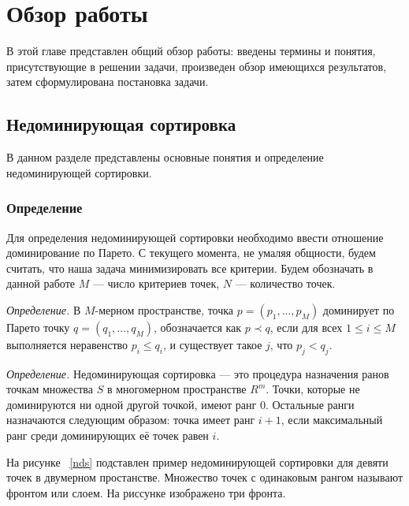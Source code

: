 
\chapter{Обзор работы}
\label{chapter1}

В этой главе представлен общий обзор работы: введены термины и понятия, присутствующие в решении задачи, произведен обзор имеющихся результатов, затем сформулирована постановка задачи.

\section{Недоминирующая сортировка}

В данном разделе представлены основные понятия и определение недоминирующей сортировки. 

\subsection{Определение}

Для определения недоминирующей сортировки необходимо ввести отношение доминирование по Парето. С текущего момента, не умаляя общности, будем считать, что наша задача минимизировать все критерии. Будем обозначать в данной работе $M$ {---} число критериев точек, $N$ {---} количество точек.

\textit{Определение.} В $M$-мерном пространстве, точка $p = (p_1,...,p_M)$ доминирует по Парето точку $q = (q_1,...,q_M)$, обозначается как $p \prec q$, если для всех $1 \leq i \leq M$ выполняется неравенство $p_i\leq q_i$, и существует такое $j$, что $p_j < q_j$.

\textit{Определение.} Недоминирующая сортировка {---} это процедура назначения ранов точкам множества $S$ в многомерном пространстве $R^m$. Точки, которые не доминируются ни одной другой точкой, имеют ранг $0$. Остальные ранги назначаются следующим образом: точка имеет ранг $i + 1$, если максимальный ранг среди
доминирующих её точек равен $i$.

На рисунке ~\ref{nds} подставлен пример недоминирующей сортировки для девяти точек в двумерном простанстве. Множество точек с одинаковым рангом называют фронтом или слоем. На риссунке изображено три фронта. 

